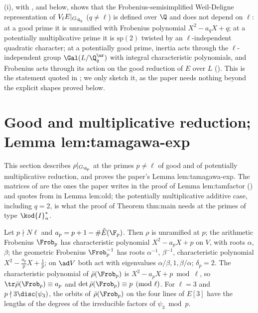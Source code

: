 \begin{remark}\label{rem:galrep:wd-independence}
(i), with ,  and  below, shows that the
Frobenius-semisimplified Weil-Deligne representation of $V_\ell E|_{G_{\Q_q}}$ ($q\ne\ell$) is defined over $\Q$ and does not depend on $\ell$: at a good
prime it is unramified with Frobenius polynomial $X^2-a_qX+q$; at a potentially multiplicative prime it is $\mathrm{sp}(2)$ twisted by an
$\ell$-independent quadratic character; at a potentially good prime, inertia acts through the $\ell$-independent group $\Gal(L/\Q_q^{\ur})$ with
integral characteristic polynomials, and Frobenius acts through its action on the good reduction of $E$ over $L$ (\cite[Section 2]{SerreTate68}).
This is the statement quoted in ; we only sketch it, as the paper needs nothing beyond the explicit shapes proved below.
\end{remark}

\section[Good and multiplicative reduction]{Good and multiplicative reduction; Lemma lem:tamagawa-exp}\label{sec:galrep:mult}

This section describes $\rho|_{G_{\Q_p}}$ at the primes $p\ne\ell$ of good and of potentially multiplicative reduction, and proves the paper's
Lemma lem:tamagawa-exp. The matrices of  are the ones the paper writes in the proof of Lemma lem:tamfactor
() and quotes from \cite[Theorem 3.1(e)]{DDT} in Lemma lem:old; the potentially multiplicative additive case, including
$q=2$, is what the proof of Theorem thm:main needs at the primes of type $\kod{I}_n^*$.

\begin{proposition}\label{prop:galrep:good}
Let $p\nmid N\ell$ and $a_p=p+1-\#\tilde E(\F_p)$. Then $\rho$ is unramified at $p$; the arithmetic Frobenius $\Frob_p$ has characteristic polynomial
$X^2-a_pX+p$ on $V$, with roots $\alpha$, $\beta$; the geometric Frobenius $\Frob_p^{-1}$ has roots $\alpha^{-1}$, $\beta^{-1}$, characteristic polynomial
$X^2-\frac{a_p}{p}X+\frac1p$; on $\ad V$ both act with eigenvalues $\alpha/\beta,1,\beta/\alpha$; $\delta_p=2$. The characteristic polynomial of $\bar\rho(\Frob_p)$
is $X^2-a_pX+p\bmod\ell$, so $\tr\bar\rho(\Frob_p)\equiv a_p$ and $\det\bar\rho(\Frob_p)\equiv p\pmod\ell$. For $\ell=3$ and $p\nmid3\disc(\psi_3)$, the orbits of $\bar\rho(\Frob_p)$
on the four lines of $E[3]$ have the lengths of the degrees of the irreducible factors of $\psi_3\bmod p$.
\end{proposition}

